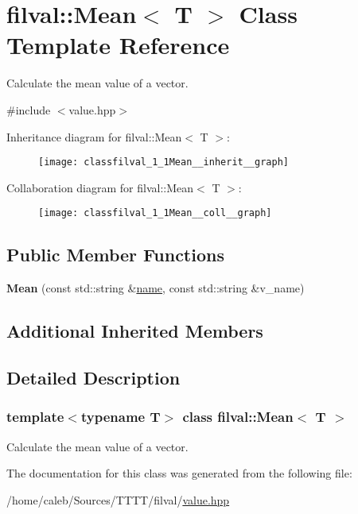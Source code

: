 \hypertarget{classfilval_1_1Mean}{}\section{filval\+:\+:Mean$<$ T $>$ Class Template Reference}
\label{classfilval_1_1Mean}


Calculate the mean value of a vector.  




{\ttfamily \#include $<$value.\+hpp$>$}



Inheritance diagram for filval\+:\+:Mean$<$ T $>$\+:
\nopagebreak
\begin{figure}[H]
\begin{center}
\leavevmode
\texttt{[image: classfilval\_1\_1Mean\_\_inherit\_\_graph]}
\end{center}
\end{figure}


Collaboration diagram for filval\+:\+:Mean$<$ T $>$\+:
\nopagebreak
\begin{figure}[H]
\begin{center}
\leavevmode
\texttt{[image: classfilval\_1\_1Mean\_\_coll\_\_graph]}
\end{center}
\end{figure}
\subsection*{Public Member Functions}
\begin{DoxyCompactItemize}
\item 
\hypertarget{classfilval_1_1Mean_a036b1c2a3dca807b2080eb24c3b07945}{}\label{classfilval_1_1Mean_a036b1c2a3dca807b2080eb24c3b07945} 
{\bfseries Mean} (const std\+::string \&\hyperlink{classfilval_1_1GenValue_a007e38c03ee041c2a657afa3d6e91ab1}{name}, const std\+::string \&v\+\_\+name)
\end{DoxyCompactItemize}
\subsection*{Additional Inherited Members}


\subsection{Detailed Description}
\subsubsection*{template$<$typename T$>$\newline
class filval\+::\+Mean$<$ T $>$}

Calculate the mean value of a vector. 

The documentation for this class was generated from the following file\+:\begin{DoxyCompactItemize}
\item 
/home/caleb/\+Sources/\+T\+T\+T\+T/filval/\hyperlink{value_8hpp}{value.\+hpp}\end{DoxyCompactItemize}
